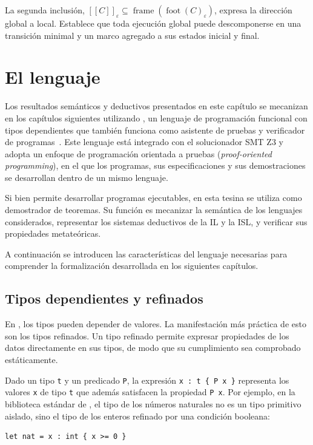 \documentclass[a4paper,	11pt]{report}
\begin{document}
La segunda inclusión,
$[\![C]\!]_\varepsilon \subseteq \operatorname{frame}(\operatorname{foot}(C)_\varepsilon)$,
expresa la dirección global a local.
Establece que toda ejecución global puede descomponerse en una transición minimal y un marco agregado a sus estados inicial y final.

\section{El lenguaje \fstar{}}
\label{sec:fstar}
Los resultados semánticos y deductivos presentados en este capítulo se mecanizan en los capítulos siguientes utilizando \fstar{},
un lenguaje de programación funcional con tipos dependientes que también funciona como asistente de pruebas
y verificador de programas~\citep{fstar}.
Este lenguaje está integrado con el solucionador SMT Z3
y adopta un enfoque de programación orientada a pruebas (\emph{proof-oriented programming}),
en el que los programas, sus especificaciones y sus demostraciones se desarrollan dentro de un mismo lenguaje.

Si bien \fstar{} permite desarrollar programas ejecutables,
en esta tesina se utiliza como demostrador de teoremas.
Su función es mecanizar la semántica de los lenguajes considerados,
representar los sistemas deductivos de la IL y la ISL,
y verificar sus propiedades metateóricas.

A continuación se introducen las características del lenguaje necesarias para comprender la formalización desarrollada en los siguientes capítulos.

\subsection*{Tipos dependientes y refinados}
En \fstar{}, los tipos pueden depender de valores.
La manifestación más práctica de esto son los tipos refinados.
Un tipo refinado permite expresar propiedades de los datos directamente en sus tipos,
de modo que su cumplimiento sea comprobado estáticamente.

Dado un tipo \lstinline|t| y un predicado \lstinline|P|,
la expresión \lstinline|x : t { P x }| representa los valores \lstinline|x| de tipo \lstinline|t| que además satisfacen la propiedad \lstinline|P x|.
Por ejemplo, en la biblioteca estándar de \fstar{},
el tipo de los números naturales no es un tipo primitivo aislado,
sino el tipo de los enteros refinado por una condición booleana:

\begin{lstlisting}
let nat = x : int { x >= 0 }
\end{lstlisting}
\end{document}

